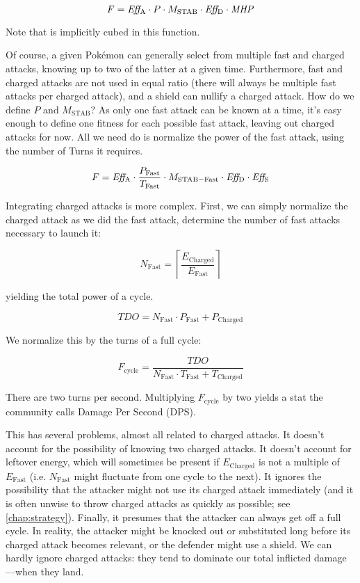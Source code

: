 \[ F = \mbox{$\mathit{Eff_\mathrm{A}}$} \cdot P \cdot M_\mathrm{STAB} \cdot \mbox{$\mathit{Eff_\mathrm{D}}$} \cdot \mbox{$\mathit{MHP}$} \]

Note that \CPM{} is implicitly cubed in this function.

Of course, a given Pokémon can generally select from multiple fast and charged attacks,
  knowing up to two of the latter at a given time.
Furthermore, fast and charged attacks are not used in equal ratio (there will
  always be multiple fast attacks per charged attack), and a shield can
  nullify a charged attack.
How do we define $P$ and $M_\mathrm{STAB}$?
As only one fast attack can be known at a time, it's easy enough to define one
  fitness for each possible fast attack, leaving out charged attacks for now.
All we need do is normalize the power of the fast attack, using the number of
  Turns it requires.

  \[ F = \mbox{$\mathit{Eff_\mathrm{A}}$} \cdot \frac{P_\mathrm{Fast}}{T_\mathrm{Fast}} \cdot M_\mathrm{STAB-Fast} \cdot \mbox{$\mathit{Eff_\mathrm{D}}$} \cdot \mbox{$\mathit{Eff_\mathrm{S}}$} \]

Integrating charged attacks is more complex.
First, we can simply normalize the charged attack as we did the fast attack,
 determine the number of fast attacks necessary to launch it:

\[ N_\mathrm{Fast} = \left\lceil\frac{E_\mathrm{Charged}}{E_\mathrm{Fast}}\right\rceil \]

yielding the total power of a cycle.

\[ \mathit{TDO} = N_\mathrm{Fast} \cdot P_\mathrm{Fast} + P_\mathrm{Charged} \]

We normalize this by the turns of a full cycle:

\[ F_\mathrm{cycle} = \frac{\mathit{TDO}}{N_\mathrm{Fast} \cdot T_\mathrm{Fast} + T_\mathrm{Charged}} \]

There are two turns per second.
Multiplying $F_\mathrm{cycle}$ by two yields a stat the community calls Damage Per Second (DPS).

This has several problems, almost all related to charged attacks.
It doesn't account for the possibility of knowing two charged attacks.
It doesn't account for leftover energy, which will sometimes be present if
  $E_\mathrm{Charged}$ is not a multiple of $E_\mathrm{Fast}$ (i.e. $N_\mathrm{Fast}$
  might fluctuate from one cycle to the next).
It ignores the possibility that the attacker might not use its charged attack
  immediately (and it is often unwise to throw charged attacks as quickly as
  possible; see \autoref{chap:strategy}).
Finally, it presumes that the attacker can always get off a full cycle.
In reality, the attacker might be knocked out or substituted long before its
  charged attack becomes relevant, or the defender might use a shield.
We can hardly ignore charged attacks: they tend to dominate our total inflicted damage---when they land.

